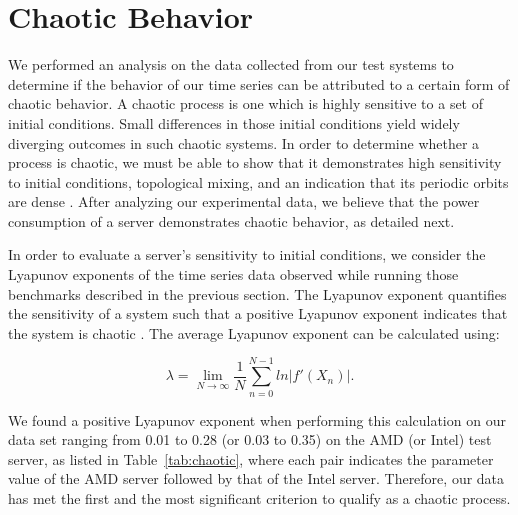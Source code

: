 \documentclass[times,10pt,finalversion]{usetex-v1}
\begin{document}
\section{Chaotic Behavior}
\label{sec:chaos}
We performed an analysis on the data collected from our test systems to
determine if the behavior of our time series can be attributed to a certain
form of chaotic behavior.  A chaotic process is one which is highly
sensitive to a set of initial conditions.  Small differences in those
initial conditions yield widely diverging outcomes in such chaotic
systems.  In order to determine whether a process is chaotic, we must be
able to show that it demonstrates high sensitivity to initial
conditions, topological mixing, and an indication that its periodic
orbits are dense \cite{Sprott2003}. After analyzing our experimental
data, we believe that the power consumption of a server demonstrates
chaotic behavior, as detailed next. 

In order to evaluate a server's sensitivity to initial conditions, we
consider the Lyapunov exponents of the time series data
observed while running those benchmarks described in the previous section.
The Lyapunov exponent quantifies the sensitivity of a system such that a
positive Lyapunov exponent indicates that the system is chaotic
\cite{Sprott2003}.  The average Lyapunov exponent can be calculated
using:
\begin{small}
{\setlength{\abovedisplayskip}{0pt plus 0pt minus 0pt}
 \setlength{\belowdisplayskip}{0pt plus 0pt minus 0pt}
  \begin{equation}
    \label{avgLypEq}
    \lambda =
    \lim_{N\to\infty}\frac{1}{N}\sum_{n=0}^{N-1}ln|f'(X_n)|.\nonumber
  \end{equation}
}
\end{small}
We found a positive Lyapunov exponent when performing this calculation
on our data set ranging from 0.01 to 0.28 (or 0.03 to 0.35) on the AMD
(or Intel) test server, as listed in Table~\ref{tab:chaotic},
where each pair indicates the parameter value of the AMD server followed by that of the Intel server.
Therefore, our data has met the first and the most significant criterion
to qualify as a chaotic process.
\end{document}

